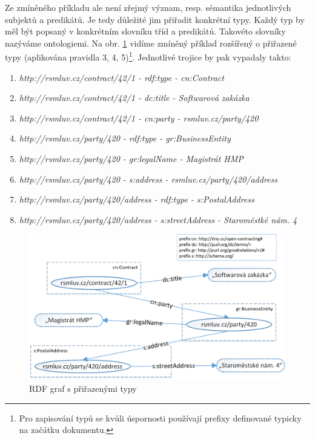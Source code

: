 \newpage

Ze zmíněného příkladu ale není zřejmý význam, resp. sémantika jednotlivých subjektů a predikátů. Je tedy důležité jim přiřadit konkrétní typy. Každý typ by měl být popsaný v konkrétním slovníku tříd a predikátů. Takovéto slovníky nazýváme ontologiemi. Na obr. \ref{obr:rdf_graphWithOntology} vidíme zmíněný příklad rozšířený o přiřazené typy (aplikována pravidla 3, 4, 5)\footnote{Pro zapisování typů se kvůli úspornosti používají prefixy definované typicky na začátku dokumentu.}. Jednotlivé trojice by pak vypadaly takto:

\begin{enumerate}
\item \textit{http://rsmluv.cz/contract/42/1 - rdf:type - cn:Contract} 
\item \textit{http://rsmluv.cz/contract/42/1 - dc:title - Softwarová zakázka}   
\item \textit{http://rsmluv.cz/contract/42/1 - cn:party - rsmluv.cz/party/420}
\item \textit{http://rsmluv.cz/party/420 - rdf:type - gr:BusinessEntity} 
\item \textit{http://rsmluv.cz/party/420 - gr:legalName - Magistrát HMP}
\item \textit{http://rsmluv.cz/party/420 - s:address - rsmluv.cz/party/420/address}
\item \textit{http://rsmluv.cz/party/420/address - rdf:type - s:PostalAddress}
\item \textit{http://rsmluv.cz/party/420/address - s:streetAddress - Staroměstké nám. 4}
\end{enumerate}

\begin{figure}[h]
\centerline{\includegraphics[width=\textwidth]{img/rdf_graphWithOntology.eps}}
\caption{RDF graf s přiřazenými typy}
\label{obr:rdf_graphWithOntology}
\end{figure}

